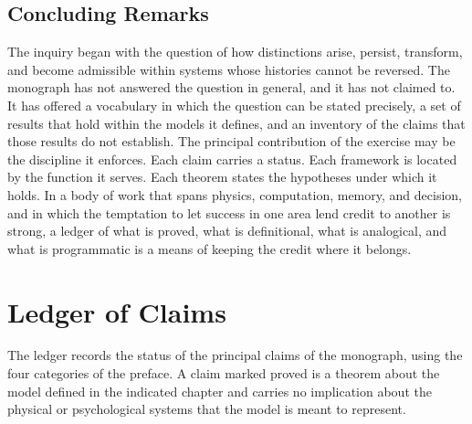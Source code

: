 \documentclass[11pt,twoside,openright]{book}
\theoremstyle{plain}
\theoremstyle{definition}
\theoremstyle{remark}
\begin{document}
\section{Concluding Remarks}

The inquiry began with the question of how distinctions arise, persist, transform, and become admissible within systems whose histories cannot be reversed. The monograph has not answered the question in general, and it has not claimed to. It has offered a vocabulary in which the question can be stated precisely, a set of results that hold within the models it defines, and an inventory of the claims that those results do not establish. The principal contribution of the exercise may be the discipline it enforces. Each claim carries a status. Each framework is located by the function it serves. Each theorem states the hypotheses under which it holds. In a body of work that spans physics, computation, memory, and decision, and in which the temptation to let success in one area lend credit to another is strong, a ledger of what is proved, what is definitional, what is analogical, and what is programmatic is a means of keeping the credit where it belongs.
\appendix

\chapter{Ledger of Claims}
\label{app:ledger}

The ledger records the status of the principal claims of the monograph, using the four categories of the preface. A claim marked proved is a theorem about the model defined in the indicated chapter and carries no implication about the physical or psychological systems that the model is meant to represent.
\end{document}

